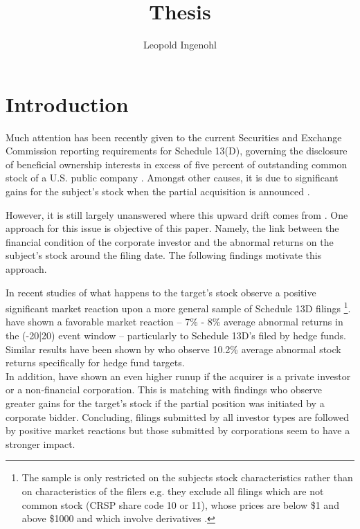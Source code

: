 \documentclass[12pt]{article}
\title{Thesis}
\author{Leopold Ingenohl}
\begin{document}
\maketitle

\pagebreak


\section{Introduction}
Much attention has been recently given to the current Securities and Exchange Commission reporting requirements for Schedule 13(D), governing the disclosure of beneficial ownership interests in excess of five percent of outstanding common stock of a U.S. public company \citep{Giglia2018}. Amongst other causes, it is due to significant gains for the subject's stock when the partial acquisition is announced \citep{Akhigbe2007}. 

However, it is still largely unanswered where this upward drift comes from \citep{Greenwood2009}. One approach for this issue is objective of this paper. Namely, the link between the financial condition of the corporate investor and the abnormal returns on the subject's stock around the filing date. The following findings motivate this approach. 


In recent studies of what happens to the target's stock  \citet{Collin-Dufresne2015} observe a positive significant market reaction upon a more general sample of Schedule 13D filings \footnote{The sample is only restricted on the subjects stock characteristics rather than on characteristics of the filers e.g. they exclude all filings which are not common stock (CRSP share code 10 or 11), whose prices are below \$1 and above \$1000 and which involve derivatives \citep{Collin-Dufresne2015}.}. \citet{Brav2008} have shown a favorable market reaction -- 7\% - 8\% average abnormal returns in the (-20|20) event window -- particularly to Schedule 13D's filed by hedge funds. Similar results have been shown by \citet{Klein2009} who observe 10.2\% average abnormal stock returns specifically for hedge fund targets.\\
In addition, \citet{Brigida2012} have shown an even higher runup if the acquirer is a private investor or a non-financial corporation. This is matching with \citet{Akhigbe2007} findings who observe greater gains for the target's stock if the partial position was initiated by a corporate bidder. Concluding, filings submitted by all investor types are followed by positive market reactions but those submitted by corporations seem to have a stronger impact.
\end{document}
